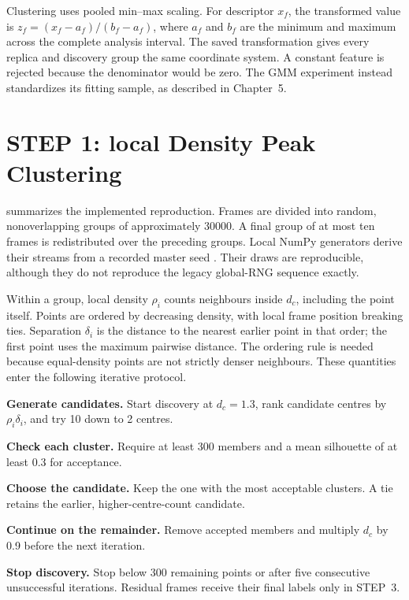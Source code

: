 Clustering uses pooled min--max scaling. For descriptor $x_f$, the transformed value is $z_f=(x_f-a_f)/(b_f-a_f)$, where $a_f$ and $b_f$ are the minimum and maximum across the complete analysis interval. The saved transformation gives every replica and discovery group the same coordinate system. A constant feature is rejected because the denominator would be zero. The GMM experiment instead standardizes its fitting sample, as described in Chapter~5.

\section{STEP 1: local Density Peak Clustering}
 summarizes the implemented reproduction. Frames are divided into random, nonoverlapping groups of approximately \num{30000}. A final group of at most ten frames is redistributed over the preceding groups. Local NumPy generators derive their streams from a recorded master seed \autocite{numpyrng}. Their draws are reproducible, although they do not reproduce the legacy global-RNG sequence exactly.

Within a group, local density $\rho_i$ counts neighbours inside $d_c$, including the point itself. Points are ordered by decreasing density, with local frame position breaking ties. Separation $\delta_i$ is the distance to the nearest earlier point in that order; the first point uses the maximum pairwise distance. The ordering rule is needed because equal-density points are not strictly denser neighbours. These quantities enter the following iterative protocol.

\begin{protocolsteps}
\item \textbf{Generate candidates.} Start discovery at $d_c=1.3$, rank candidate centres by $\rho_i\delta_i$, and try 10 down to 2 centres.
\item \textbf{Check each cluster.} Require at least 300 members and a mean silhouette of at least 0.3 for acceptance.
\item \textbf{Choose the candidate.} Keep the one with the most acceptable clusters. A tie retains the earlier, higher-centre-count candidate.
\item \textbf{Continue on the remainder.} Remove accepted members and multiply $d_c$ by 0.9 before the next iteration.
\item \textbf{Stop discovery.} Stop below 300 remaining points or after five consecutive unsuccessful iterations. Residual frames receive their final labels only in STEP~3.
\end{protocolsteps}

